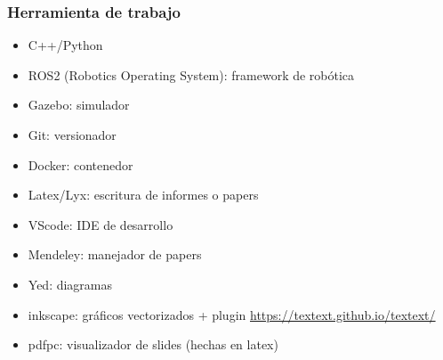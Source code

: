 \begin{frame}
    \frametitle{Herramienta de trabajo}

    \begin{itemize}
        \item C++/Python
        \item ROS2 (Robotics Operating System): framework de robótica
        \item Gazebo: simulador
        \item Git: versionador
        \item Docker: contenedor
        \item Latex/Lyx: escritura de informes o papers
        \item VScode: IDE de desarrollo
        \item Mendeley: manejador de papers
        \item Yed: diagramas
        \item inkscape: gráficos vectorizados + plugin \href{TexText}{https://textext.github.io/textext/}
        \item pdfpc: visualizador de slides (hechas en latex)
    \end{itemize}
\end{frame}